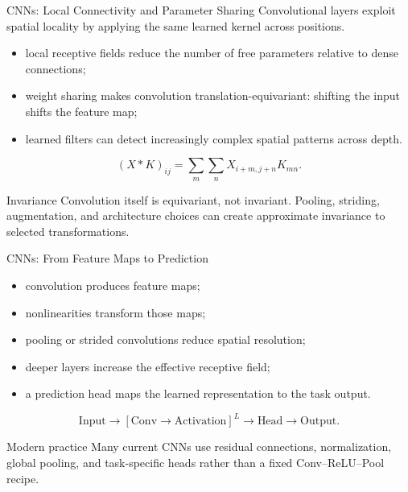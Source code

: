 
\begin{frame}{CNNs: Local Connectivity and Parameter Sharing}
Convolutional layers exploit spatial locality by applying the same learned kernel across positions.

\begin{itemize}
  \item local receptive fields reduce the number of free parameters relative to dense connections;
  \item weight sharing makes convolution translation-equivariant: shifting the input shifts the feature map;
  \item learned filters can detect increasingly complex spatial patterns across depth.
\end{itemize}

\[
  (X*K)_{ij}=\sum_m\sum_n X_{i+m,j+n}K_{mn}.
\]

\begin{alertblock}{Invariance}
Convolution itself is equivariant, not invariant. Pooling, striding, augmentation, and architecture choices can create approximate invariance to selected transformations.
\end{alertblock}
\end{frame}

\begin{frame}{CNNs: From Feature Maps to Prediction}
\begin{itemize}
  \item convolution produces feature maps;
  \item nonlinearities transform those maps;
  \item pooling or strided convolutions reduce spatial resolution;
  \item deeper layers increase the effective receptive field;
  \item a prediction head maps the learned representation to the task output.
\end{itemize}

\[
  \text{Input}\rightarrow
  [\text{Conv}\rightarrow\text{Activation}]^L
  \rightarrow\text{Head}\rightarrow\text{Output}.
\]

\begin{block}{Modern practice}
Many current CNNs use residual connections, normalization, global pooling, and task-specific heads rather than a fixed Conv--ReLU--Pool recipe.
\end{block}
\end{frame}

